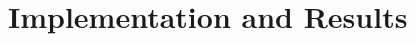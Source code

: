 \chapter{Implementation and Results}
\setcounter{figure}{1}      %
\label{ch:implementation_and_results} 


